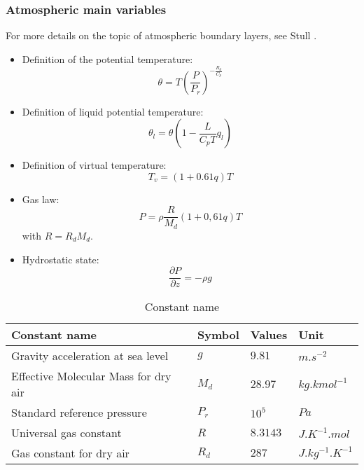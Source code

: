 \subsubsection{Atmospheric main variables}

For more details on the topic of atmospheric boundary layers, see  Stull
\cite{stull}.
%
\begin{itemize}
\item Definition of the potential temperature:
\[
\theta =T\left(\frac{P}{P_{r}}\right)^{-\frac{R_{d}}{C_{p}}}
\]
\item Definition of liquid potential temperature:
\[
\theta_{l} = \theta \left( 1-\frac{L}{C_{p}T} q_{l} \right)
\]
\item Definition of virtual temperature:
\[
T_{v} = \left(1+0.61q\right)T
\]
\item Gas law:
\[
P = \rho \frac{R}{M_{d}}\left(1+0,61q\right)T
\]
with $R=R_{d} M_{d}$.
\item Hydrostatic state:
\[
\frac{\partial P}{\partial z} = -\rho g
\]
\end{itemize}
%
\begin{table}[htbp]
\begin{center}
\begin{tabular}{|l|l|l|l|}
\hline
\textbf{Constant name} & \textbf{Symbol} & \textbf{Values} & \textbf{Unit} \\
\hline
Gravity acceleration at sea level & $g$ & $9.81$ & $m.s^{-2}$ \\
\hline
Effective Molecular Mass for dry air & $M_{d}$ & $28.97$ & $kg.kmol^{-1}$ \\
\hline
Standard reference pressure & $P_{r}$ & $10^{5}$ & $Pa$ \\
\hline
Universal gas constant & $R$ & $8.3143$ & $J.K^{-1}.mol$ \\
\hline
Gas constant for dry air & $R_{d}$ & $287$ & $J.kg^{-1}.K^{-1}$ \\
\hline
\end{tabular}\label{tab2}
\end{center}
\caption{Constant name}
\end{table}

